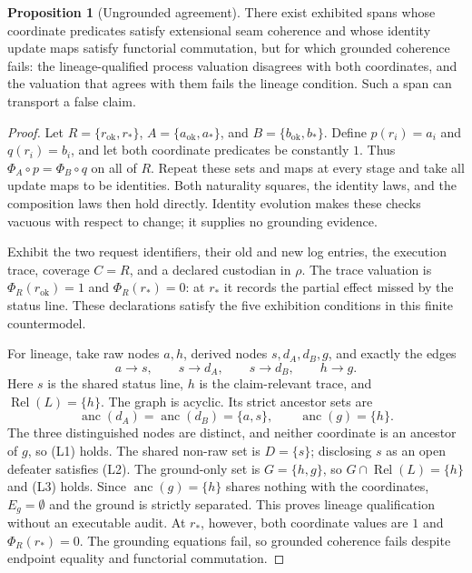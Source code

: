\documentclass[11pt]{article}
\theoremstyle{definition}
\newtheorem{proposition}{Proposition}[section]
\begin{document}
\begin{proposition}[Ungrounded agreement]\label{ex:prop:ungrounded-agreement}
There exist exhibited spans whose coordinate predicates satisfy extensional seam coherence and whose identity update maps satisfy functorial commutation, but for which grounded coherence fails: the lineage-qualified process valuation disagrees with both coordinates, and the valuation that agrees with them fails the lineage condition. Such a span can transport a false claim.
\end{proposition}

\begin{proof}
Let $R=\{r_{\mathrm{ok}},r_*\}$, $A=\{a_{\mathrm{ok}},a_*\}$, and $B=\{b_{\mathrm{ok}},b_*\}$. Define $p(r_i)=a_i$ and $q(r_i)=b_i$, and let both coordinate predicates be constantly $1$. Thus $\Phi_A\circ p=\Phi_B\circ q$ on all of $R$. Repeat these sets and maps at every stage and take all update maps to be identities. Both naturality squares, the identity laws, and the composition laws then hold directly. Identity evolution makes these checks vacuous with respect to change; it supplies no grounding evidence.

Exhibit the two request identifiers, their old and new log entries, the execution trace, coverage $C=R$, and a declared custodian in $\rho$. The trace valuation is $\Phi_R(r_{\mathrm{ok}})=1$ and $\Phi_R(r_*)=0$: at $r_*$ it records the partial effect missed by the status line. These declarations satisfy the five exhibition conditions in this finite countermodel.

For lineage, take raw nodes $a,h$, derived nodes $s,d_A,d_B,g$, and exactly the edges
\[
a\to s,\qquad s\to d_A,\qquad s\to d_B,\qquad h\to g.
\]
Here $s$ is the shared status line, $h$ is the claim-relevant trace, and $\operatorname{Rel}(L)=\{h\}$. The graph is acyclic. Its strict ancestor sets are
\[
\operatorname{anc}(d_A)=\operatorname{anc}(d_B)=\{a,s\},
\qquad \operatorname{anc}(g)=\{h\}.
\]
The three distinguished nodes are distinct, and neither coordinate is an ancestor of $g$, so (L1) holds. The shared non-raw set is $D=\{s\}$; disclosing $s$ as an open defeater satisfies (L2). The ground-only set is $G=\{h,g\}$, so $G\cap\operatorname{Rel}(L)=\{h\}$ and (L3) holds. Since $\operatorname{anc}(g)=\{h\}$ shares nothing with the coordinates, $E_g=\emptyset$ and the ground is strictly separated. This proves lineage qualification without an executable audit. At $r_*$, however, both coordinate values are $1$ and $\Phi_R(r_*)=0$. The grounding equations fail, so grounded coherence fails despite endpoint equality and functorial commutation.


\end{proof}
\end{document}
